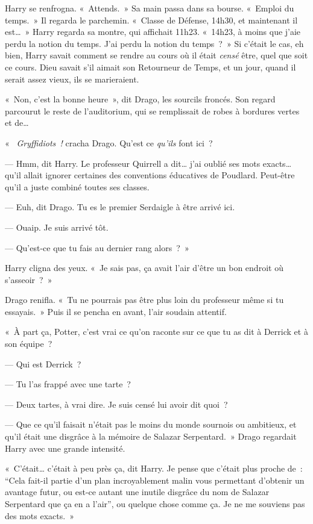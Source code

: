 Harry se renfrogna. «~Attends.~» Sa main passa dans sa bourse. «~Emploi du temps.~» Il regarda le parchemin. «~Classe de Défense, 14h30, et maintenant il est…~» Harry regarda sa montre, qui affichait 11h23. «~14h23, à moins que j'aie perdu la notion du temps. J'ai perdu la notion du temps~?~» Si c'était le cas, eh bien, Harry savait comment se rendre au cours où il était \emph{censé} être, quel que soit ce cours. Dieu savait s'il aimait son Retourneur de Temps, et un jour, quand il serait assez vieux, ils se marieraient.

«~Non, c'est la bonne heure~», dit Drago, les sourcils froncés. Son regard parcourut le reste de l'auditorium, qui se remplissait de robes à bordures vertes et de…

«~ \emph{Gryffidiots~!} cracha Drago. Qu'est ce \emph{qu'ils} font ici~?

--- Hmm, dit Harry. Le professeur Quirrell a dit… j'ai oublié ses mots exacts… qu'il allait ignorer certaines des conventions éducatives de Poudlard. Peut-être qu'il a juste combiné toutes ses classes.

--- Euh, dit Drago. Tu es le premier Serdaigle à être arrivé ici.

--- Ouaip. Je suis arrivé tôt.

--- Qu'est-ce que tu fais au dernier rang alors~?~»

Harry cligna des yeux. «~Je sais pas, ça avait l'air d'être un bon endroit où s'asseoir~?~»

Drago renifla. «~Tu ne pourrais pas être plus loin du professeur même si tu essayais.~» Puis il se pencha en avant, l'air soudain attentif.

«~À part ça, Potter, c'est vrai ce qu'on raconte sur ce que tu as dit à Derrick et à son équipe~?

--- Qui est Derrick~?

--- Tu l'as frappé avec une tarte~?

--- Deux tartes, à vrai dire. Je suis censé lui avoir dit quoi~?

--- Que ce qu'il faisait n'était pas le moins du monde sournois ou ambitieux, et qu'il était une disgrâce à la mémoire de Salazar Serpentard.~» Drago regardait Harry avec une grande intensité.

«~C'était… c'était à peu près ça, dit Harry. Je pense que c'était plus proche de~: “Cela fait-il partie d'un plan incroyablement malin vous permettant d'obtenir un avantage futur, ou est-ce autant une inutile disgrâce du nom de Salazar Serpentard que ça en a l'air”, ou quelque chose comme ça. Je ne me souviens pas des mots exacts.~»

